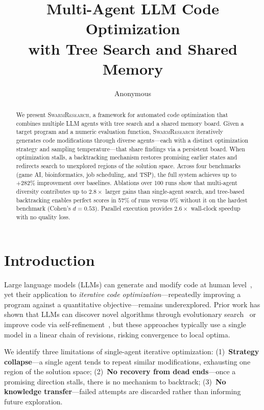 \documentclass{article}
\title{Multi-Agent LLM Code Optimization\\with Tree Search and Shared Memory}
\author{
  Anonymous \\
}
\begin{document}
\maketitle

\begin{abstract}
We present \textsc{SwarmResearch}, a framework for automated code optimization that combines multiple LLM agents with tree search and a shared memory board.
Given a target program and a numeric evaluation function, \textsc{SwarmResearch} iteratively generates code modifications through diverse agents---each with a distinct optimization strategy and sampling temperature---that share findings via a persistent board.
When optimization stalls, a backtracking mechanism restores promising earlier states and redirects search to unexplored regions of the solution space.
Across four benchmarks (game AI, bioinformatics, job scheduling, and TSP), the full system achieves up to $+282\%$ improvement over baselines.
Ablations over 100 runs show that multi-agent diversity contributes up to $2.8\times$ larger gains than single-agent search, and tree-based backtracking enables perfect scores in 57\% of runs versus 0\% without it on the hardest benchmark (Cohen's $d{=}0.53$).
Parallel execution provides $2.6\times$ wall-clock speedup with no quality loss.
\end{abstract}

\section{Introduction}
\label{sec:intro}

Large language models (LLMs) can generate and modify code at human level~\cite{li2023alphacode2}, yet their application to \emph{iterative code optimization}---repeatedly improving a program against a quantitative objective---remains underexplored.
Prior work has shown that LLMs can discover novel algorithms through evolutionary search~\cite{romera2024funsearch} or improve code via self-refinement~\cite{madaan2023selfrefine}, but these approaches typically use a single model in a linear chain of revisions, risking convergence to local optima.

We identify three limitations of single-agent iterative optimization:
(1)~\textbf{Strategy collapse}---a single agent tends to repeat similar modifications, exhausting one region of the solution space;
(2)~\textbf{No recovery from dead ends}---once a promising direction stalls, there is no mechanism to backtrack;
(3)~\textbf{No knowledge transfer}---failed attempts are discarded rather than informing future exploration.
\end{document}
